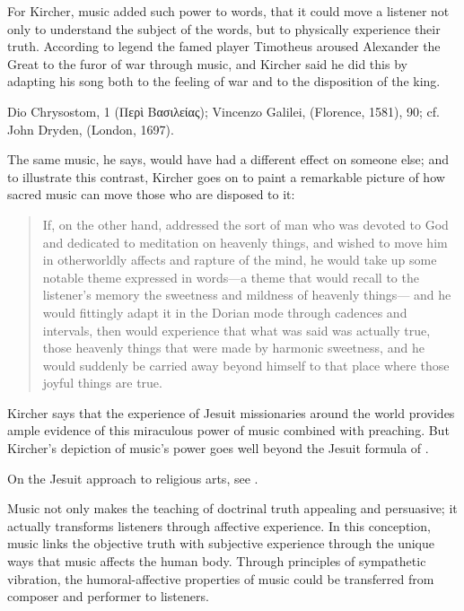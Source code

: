 For Kircher, music added such power to words, that it could move a listener not only to understand the subject of the words, but to physically experience their truth.
According to legend the famed  player Timotheus aroused Alexander the Great to the furor of war through music, and Kircher said he did this by adapting his song both to the feeling of war and to the disposition of the king.%
    \begin{Footnote}
        Dio Chrysostom,  1 (\textgreek{Περὶ Βασιλείας}); Vincenzo Galilei,  (Florence, 1581), 90; cf. John Dryden,  (London, 1697).\XXX
    \end{Footnote}
The same music, he says, would have had a different effect on someone else; and to illustrate this contrast, Kircher goes on to paint a remarkable picture of how sacred music can move those who are disposed to it:
\begin{quote}
    If, on the other hand,  addressed the sort of man who was devoted to God and dedicated to meditation on heavenly things,
    and wished to move him in otherworldly affects and rapture of the mind,
    he would take up some notable theme expressed in words---a theme that would recall to the listener's memory the sweetness and mildness of heavenly things---
    and he would fittingly adapt it in the Dorian mode through cadences and intervals,
    then  would experience that what was said was actually true,
    those heavenly things that were made by harmonic sweetness,
    and he would suddenly be carried away beyond himself to that place where those joyful things are true.%
        \Autocite
        [bk.~7, 550:
        .]
        {Kircher:Musurgia}
\end{quote}

Kircher says that the experience of Jesuit missionaries around the world provides ample evidence of this miraculous power of music combined with preaching.
But Kircher's depiction of music's power goes well beyond the Jesuit formula of .%
\begin{Footnote}
    On the Jesuit approach to religious arts, see \autocite[\XXX]{Bailey:Art}.
\end{Footnote}
Music not only makes the teaching of doctrinal truth appealing and persuasive; it actually transforms listeners through affective experience.
In this conception, music links the objective truth with subjective experience through the unique ways that music affects the human body.
Through principles of sympathetic vibration, the humoral-affective properties of music could be transferred from composer and performer to listeners.

